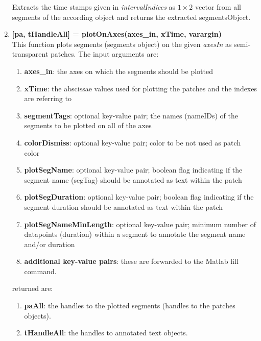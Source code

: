 \documentclass[a4]{scrreprt}
\begin{document}
\begin{enumerate}
	Extracts the time stamps given in \textit{intervalIndices} as $1 \times 2$ vector from all segments of the according object and returns the extracted segmentsObject.
	
	\item \textbf{[pa, tHandleAll] = plotOnAxes(axes\_in, xTime, varargin)}\\
	This function plots  segments (segments object) on the given \textit{axesIn} as semi-transparent patches.
	The input arguments are:
	\begin{enumerate}
		\item \textbf{axes\_in}: the axes on which the segments should be plotted
		\item \textbf{xTime}: the abscissae values used for plotting the patches and the indexes are referring to
		\item \textbf{segmentTags}: optional key-value pair;  the names (nameIDs) of the segments to be plotted on all of the axes
		\item \textbf{colorDismiss}: optional key-value pair;  color to be not used as patch color
		\item \textbf{plotSegName}: optional key-value pair;  boolean flag indicating if the segment name (segTag) should be annotated as text within the patch
		\item \textbf{plotSegDuration}: optional key-value pair;  boolean flag indicating if the segment duration should be annotated as text within the patch
		\item \textbf{plotSegNameMinLength}: optional key-value pair;  minimum number of datapoints (duration) within a segment to annotate the segment name and/or duration
		\item \textbf{additional key-value pairs}: these are forwarded to the Matlab fill command.
	\end{enumerate}
	returned are:
	\begin{enumerate}
		\item \textbf{paAll}: the handles to the plotted segments (handles to the patches objects).
		\item \textbf{tHandleAll}: the handles to annotated text objects.
	\end{enumerate}	
\end{enumerate}
%
%
\end{document}
